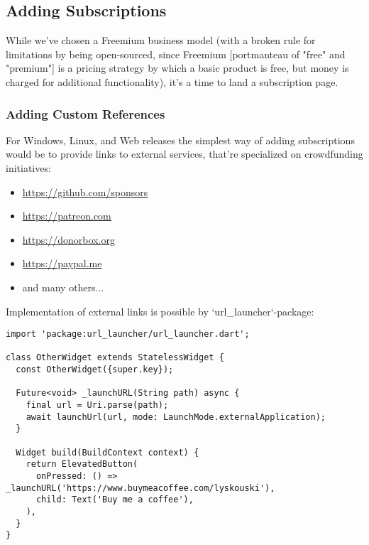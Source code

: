 
\subsection{Adding Subscriptions}

While we've chosen a Freemium business model (with a broken rule for limitations by being open-sourced, since Freemium 
[portmanteau of "free" and "premium"] is a pricing strategy by which a basic product is free, but money is charged for 
additional functionality), it's a time to land a subscription page.


\subsubsection{Adding Custom References}

For Windows, Linux, and Web releases the simplest way of adding subscriptions would be to provide links to external 
services, that're specialized on crowdfunding initiatives:

\begin{itemize}
  \item  \href{https://github.com/sponsors}{https://github.com/sponsors}
  \item  \href{https://patreon.com}{https://patreon.com}
  \item  \href{https://donorbox.org}{https://donorbox.org}
  \item  \href{https://paypal.me}{https://paypal.me}
  \item  and many others...
\end{itemize}

\noindent Implementation of external links is possible by `url\_launcher`-package:

\begin{lstlisting}
import 'package:url_launcher/url_launcher.dart';

class OtherWidget extends StatelessWidget {
  const OtherWidget({super.key});

  Future<void> _launchURL(String path) async {
    final url = Uri.parse(path);
    await launchUrl(url, mode: LaunchMode.externalApplication);
  }

  Widget build(BuildContext context) {
    return ElevatedButton(
      onPressed: () => _launchURL('https://www.buymeacoffee.com/lyskouski'),
      child: Text('Buy me a coffee'),
    ),
  }
}
\end{lstlisting}


